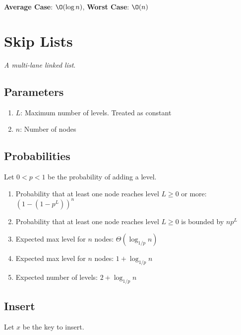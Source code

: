 \documentclass[12pt, letterpaper]{article}
\begin{document}
\begin{multicols*}{3}
        {\bf Average Case}: $\O(\log n)$, {\bf Worst Case}: $\O(n)$


        
        \section{Skip Lists}
        {\it A multi-lane linked list}.

        \subsection{Parameters}
        \begin{enumerate}
            \item  $L$: Maximum number of levels. Treated as constant
            \item $n$: Number of nodes
        \end{enumerate}

        \subsection{Probabilities}

        Let $0 < p < 1$ be the probability of adding a level.
        \begin{enumerate}
            \item Probability that at least one node reaches level $L \ge 0$ or more: $(1 - (1 - p^L))^n$
            \item Probability that at least one node reaches level $L \ge 0$ is bounded by $n p^L$
            \item Expected max level for $n$ nodes: $\Theta(\log_{1 / p} n)$
            \item Expected max level for $n$ nodes: $1 + \log_{1 / p} n$
            \item Expected number of levels: $2 + \log_{1 / p} n$
        \end{enumerate}



        \subsection{Insert}
        Let $x$ be the key to insert.


\end{multicols*}
\end{document}
